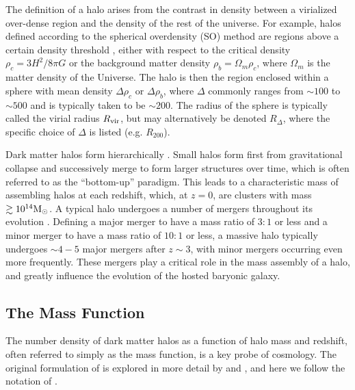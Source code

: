 The definition of a halo arises from the contrast in density between a virialized over-dense region and the density of the rest of the universe.  For example, halos defined according to the spherical overdensity (SO) method are regions above a certain density threshold \citep{1998ApJ...495...80B}, either with respect to the critical density $\rho_{c} = 3 H^{2} / 8 \pi G$ or the background matter density $\rho_{b} = \Omega_{m} \rho_{c}$, where $\Omega_{m}$ is the matter density of the Universe.  The halo is then the region enclosed within a sphere with mean density $\Delta \rho_{c}$ or $\Delta \rho_{b}$, where $\Delta$ commonly ranges from $\sim 100$ to $\sim 500$ and is typically taken to be $\sim 200$.  The radius of the sphere is typically called the virial radius ${R_{\mathrm{vir}}}$, but may alternatively be denoted $R_{\Delta}$, where the specific choice of $\Delta$ is listed (e.g. $R_{200}$).

Dark matter halos form hierarchically \citep[e.g.,][and references therein]{2000MNRAS.319..168C, 2003AJ....126.1183C}.  Small halos form first from gravitational collapse and successively merge to form larger structures over time, which is often referred to as the ``bottom-up'' paradigm.  This leads to a characteristic mass of assembling halos at each redshift, which, at $z = 0$, are clusters with mass $\gtrsim 10^{14} {\rm M_\odot}$.  A typical halo undergoes a number of mergers throughout its evolution \citep[e.g.][]{2003AJ....126.1183C, 2009ApJ...701.2002G, 2010MNRAS.406.2267F}.  Defining a major merger to have a mass ratio of $3:1$ or less and a minor merger to have a mass ratio of $10:1$ or less, a massive halo typically undergoes $\sim 4-5$ major mergers after $z \sim 3$, with minor mergers occurring even more frequently.  These mergers play a critical role in the mass assembly of a halo, and greatly influence the evolution of the hosted baryonic galaxy.




\subsection{The Mass Function}
\label{subsec:early_universe--dark_matter_halos--mass}


The number density of dark matter halos as a function of halo mass and redshift, often referred to simply as the mass function, is a key probe of cosmology.  The original formulation of \citet{1974ApJ...187..425P} is explored in more detail by \citet{2002MNRAS.336..112M} and \citet{2006ApJ...646..881W}, and here we follow the notation of \citet{2002MNRAS.336..112M}.

